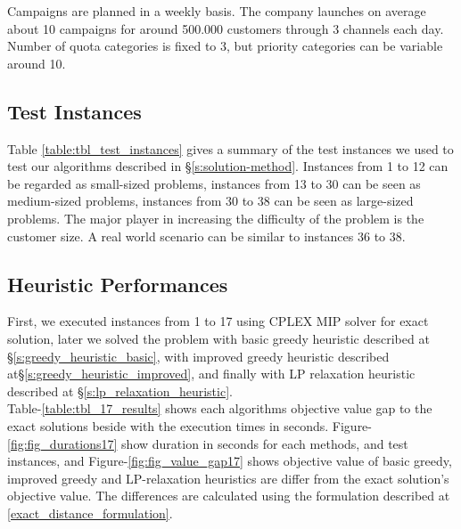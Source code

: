 \documentclass[11pt]{article}
\begin{document}
Campaigns are planned in a weekly basis. The company launches on average about 10 campaigns for around 500.000 customers through 3 channels each day. Number of quota categories is fixed to 3, but priority categories can be variable around 10.

\subsection{Test Instances} \label{test_cases}
Table \ref{table:tbl_test_instances} gives a summary of the test instances we used to test our algorithms described in \S \ref{s:solution-method}. Instances from 1 to 12 can be regarded as small-sized problems, instances from 13 to 30 can be seen as medium-sized problems, instances from 30 to 38 can be seen as large-sized problems. The major player in increasing the difficulty of the problem is the customer size. A real world scenario can be similar to instances 36 to 38.\\

\begin{table}[htb!]
\end{table}
\clearpage

\subsection{Heuristic Performances} \label{s:test_evaluation}
First, we executed instances from 1 to 17 using CPLEX MIP solver for exact solution, later we solved the problem with basic greedy heuristic described at \S \ref{s:greedy_heuristic_basic}, with improved greedy heuristic described at\S \ref{s:greedy_heuristic_improved}, and finally with LP relaxation heuristic described at \S \ref{s:lp_relaxation_heuristic}.\\

Table-\ref{table:tbl_17_results} shows each algorithms objective value gap to the exact solutions beside with the execution times in seconds. Figure-\ref{fig:fig_durations17} show duration in seconds for each methods, and test instances, and Figure-\ref{fig:fig_value_gap17} shows objective value of basic greedy, improved greedy and LP-relaxation heuristics are differ from the exact solution's objective value. The differences are calculated using the formulation described at \equationautorefname \eqref{exact_distance_formulation}.\\
\end{document}
